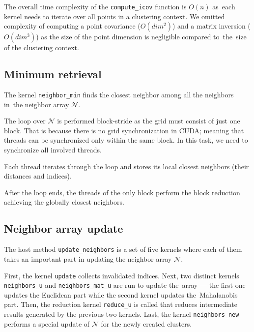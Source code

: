 \begin{rem}
The overall time complexity of the \texttt{compute\_icov} function is $O(n)$ as~each kernel needs to iterate over all points in a clustering context. We omitted complexity of computing a point covariance ($O(dim^2)$) and a matrix inversion ($O(dim^3)$) as the size of the point dimension is negligible compared to~the~size of the clustering context.
\end{rem}

\subsection{Minimum retrieval}

The kernel \texttt{neighbor\_min} finds the closest neighbor among all the neighbors in~the neighbor array $\mathcal{N}$.

The loop over $\mathcal{N}$ is performed block-stride as the grid must consist of just one block. That is because there is no grid synchronization in CUDA; meaning that threads can be synchronized only within the same block. In this task, we need to synchronize all involved threads.

Each thread iterates through the loop and stores its local closest neighbors (their distances and indices).

After the loop ends, the threads of the only block perform the block reduction achieving the globally closest neighbors.

\subsection{Neighbor array update}


The host method \texttt{update\_neighbors} is a set of five kernels where each of them takes an important part in updating the neighbor array $\mathcal{N}$.

First, the kernel \texttt{update} collects invalidated indices. Next, two distinct kernels \texttt{neighbors\_u} and \texttt{neighbors\_mat\_u} are run to update the~array --- the first one updates the Euclidean part while the second kernel updates the~Mahalanobis part. Then, the reduction kernel \texttt{reduce\_u} is called that reduces intermediate results generated by the previous two kernels. Last, the kernel \texttt{neighbors\_new} performs a special update of $\mathcal{N}$ for the newly created clusters.

